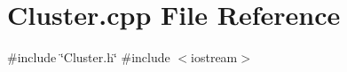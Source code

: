 \section{Cluster.\+cpp File Reference}
\label{_cluster_8cpp}
{\ttfamily \#include \char`\"{}Cluster.\+h\char`\"{}}\newline
{\ttfamily \#include $<$iostream$>$}\newline

